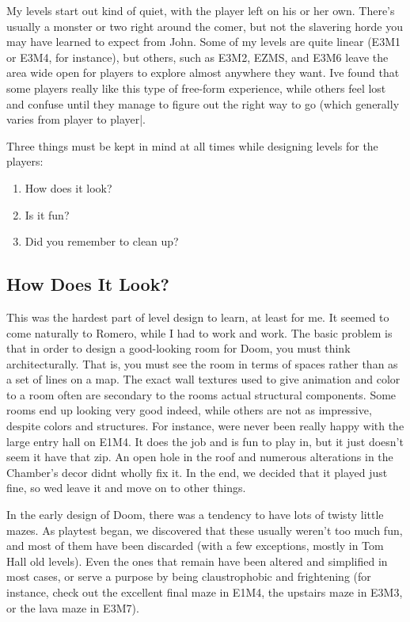    \par
    My levels start out kind of quiet, with the player left on his or her own. There's usually a monster or two right around the comer, but not the slavering horde you may have learned to expect from John. Some of my levels are quite linear (E3M1 or E3M4, for instance), but others, such as E3M2, EZMS, and E3M6 leave the area wide open for players to explore almost anywhere they want. Ive found that some players really like this type of free-form experience, while others feel lost and confuse until they manage to figure out the right way to go (which generally varies from player to player|.\\
    \par
     Three things must be kept in mind at all times while designing levels for the players:
\begin{enumerate}
\item How does it look?
\item Is it fun?
\item Did you remember to clean up?
\end{enumerate}
\par

\subsection{How Does It Look?}

This was the hardest part of level design to learn, at least for me. It seemed to come naturally to Romero, while I had to work and work. The basic problem is that in order to design a good-looking room for Doom, you must think architecturally. That is, you must see the room in terms of spaces rather than as a set of lines on a map. The exact wall textures used to give animation and color to a room often are secondary to the rooms actual structural components. Some rooms end up looking very good indeed, while others are not as impressive, despite colors and structures. For instance, were never been really happy with the large entry hall on E1M4. It does the job and is fun to play in, but it just doesn't seem it have that zip. An open hole in the roof and numerous alterations in the Chamber's decor didnt wholly fix it. In the end, we decided that it played just fine, so wed leave it and move on to other things.\\
\par
 In the early design of Doom, there was a tendency to have lots of twisty little mazes. As playtest began, we discovered that these usually weren't too much fun, and most of them have been discarded (with a few exceptions, mostly in Tom Hall old levels). Even the ones that remain have been altered and simplified in most cases, or serve a purpose by being claustrophobic and frightening (for instance, check out the excellent final maze in E1M4, the upstairs maze in E3M3, or the lava maze in E3M7).


